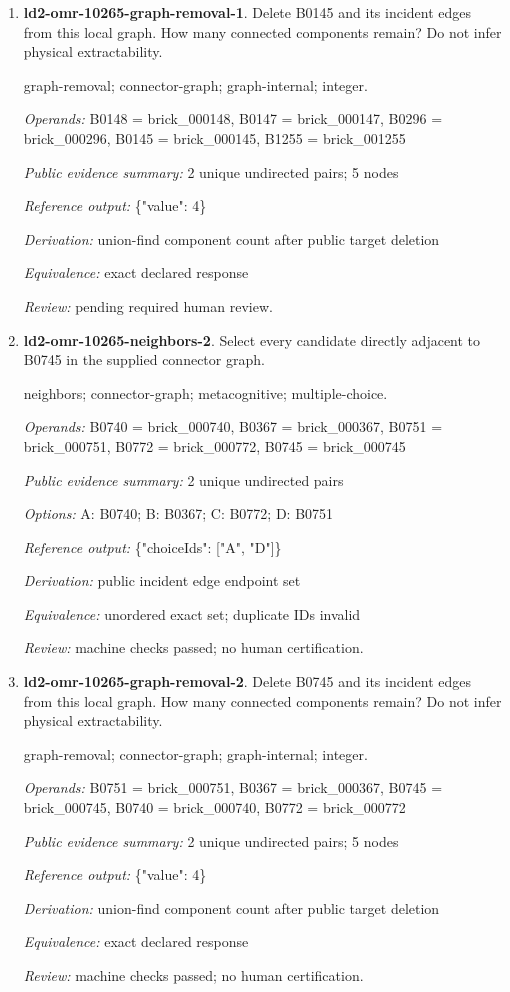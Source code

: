 \begin{enumerate}
\item \textbf{ld2-omr-10265-graph-removal-1}. Delete B0145 and its incident edges from this local graph. How many connected components remain? Do not infer physical extractability.
\par{\small graph-removal; connector-graph; graph-internal; integer.\par\textit{Operands:} B0148 = brick\_000148, B0147 = brick\_000147, B0296 = brick\_000296, B0145 = brick\_000145, B1255 = brick\_001255\par\textit{Public evidence summary:} 2 unique undirected pairs; 5 nodes\par\textit{Reference output:} \{"value": 4\}\par\textit{Derivation:} union-find component count after public target deletion\par\textit{Equivalence:} exact declared response\par\textit{Review:} pending required human review.}
\item \textbf{ld2-omr-10265-neighbors-2}. Select every candidate directly adjacent to B0745 in the supplied connector graph.
\par{\small neighbors; connector-graph; metacognitive; multiple-choice.\par\textit{Operands:} B0740 = brick\_000740, B0367 = brick\_000367, B0751 = brick\_000751, B0772 = brick\_000772, B0745 = brick\_000745\par\textit{Public evidence summary:} 2 unique undirected pairs\par\textit{Options:} A: B0740; B: B0367; C: B0772; D: B0751\par\textit{Reference output:} \{"choiceIds": ["A", "D"]\}\par\textit{Derivation:} public incident edge endpoint set\par\textit{Equivalence:} unordered exact set; duplicate IDs invalid\par\textit{Review:} machine checks passed; no human certification.}
\item \textbf{ld2-omr-10265-graph-removal-2}. Delete B0745 and its incident edges from this local graph. How many connected components remain? Do not infer physical extractability.
\par{\small graph-removal; connector-graph; graph-internal; integer.\par\textit{Operands:} B0751 = brick\_000751, B0367 = brick\_000367, B0745 = brick\_000745, B0740 = brick\_000740, B0772 = brick\_000772\par\textit{Public evidence summary:} 2 unique undirected pairs; 5 nodes\par\textit{Reference output:} \{"value": 4\}\par\textit{Derivation:} union-find component count after public target deletion\par\textit{Equivalence:} exact declared response\par\textit{Review:} machine checks passed; no human certification.}

\end{enumerate}
